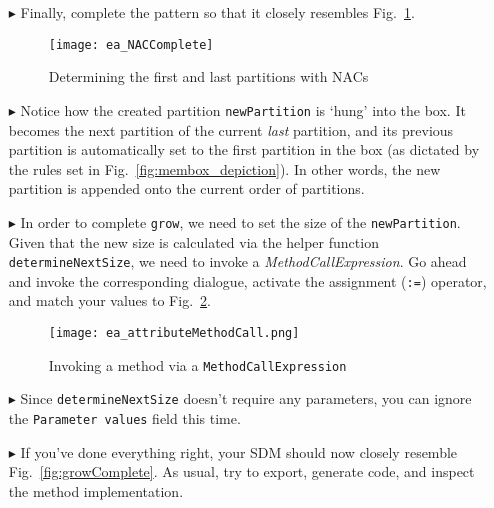 \begin{itemize}
\item[$\blacktriangleright$] Finally, complete the pattern so that it closely resembles Fig.~\ref{fig:sdm_grow_3}. 

\begin{figure}[htbp]
\begin{center}
  \texttt{[image: ea\_NACComplete]} 
  \caption{Determining the first and last partitions with NACs}  
  \label{fig:sdm_grow_3}
\end{center}
\end{figure}
 
\item[$\blacktriangleright$] Notice how the created partition \texttt{newPartition} is `hung' into the box. It becomes the next partition of the current
\emph{last} partition, and its previous partition is automatically set to the first partition in the box (as dictated by the rules set in
Fig.~\ref{fig:membox_depiction}). In other words, the new partition is appended onto the current order of partitions.

\item[$\blacktriangleright$] In order to complete \texttt{grow}, we need to set the size of the \texttt{newPartition}. Given that the new size is calculated
via the helper function \texttt{det\-er\-mine\-Next\-Size}, we need to invoke a \emph{MethodCallExpression}. Go ahead and invoke the corresponding dialogue,
activate the assignment (\texttt{:=}) operator, and match your values to Fig.~\ref{fig:sdm_grow_4}.
 
\begin{figure}[htbp]
\begin{center}
  \texttt{[image: ea\_attributeMethodCall.png]}
  \caption{Invoking a method via a \texttt{MethodCallExpression}}  
  \label{fig:sdm_grow_4} 
\end{center}
\end{figure}

\item[$\blacktriangleright$] Since \texttt{determineNextSize} doesn't require any parameters, you can ignore the \texttt{Parameter values} field this time. 

\vspace{0.5cm}

\item[$\blacktriangleright$] If you've done everything right, your SDM should now closely resemble Fig.~\ref{fig:growComplete}. As usual, try to export,
generate code, and inspect the method implementation.


\end{itemize}
